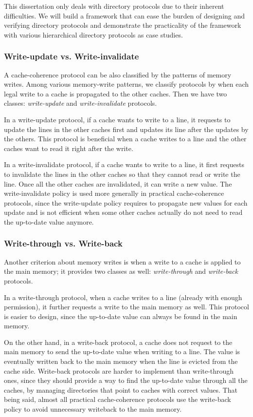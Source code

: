 This dissertation only deals with directory protocols due to their inherent difficulties.
We will build a framework that can ease the burden of designing and verifying directory protocols and demonstrate the practicality of the framework with various hierarchical directory protocols as case studies.

\subsubsection{Write-update vs. Write-invalidate}

A cache-coherence protocol can be also classified by the patterns of memory writes.
Among various memory-write patterns, we classify protocols by when each legal write to a cache is propagated to the other caches.
Then we have two classes: \emph{write-update} and \emph{write-invalidate} protocols.

In a write-update protocol, if a cache wants to write to a line, it requests to update the lines in the other caches first and updates its line after the updates by the others.
This protocol is beneficial when a cache writes to a line and the other caches want to read it right after the write.

In a write-invalidate protocol, if a cache wants to write to a line, it first requests to invalidate the lines in the other caches so that they cannot read or write the line.
Once all the other caches are invalidated, it can write a new value.
The write-invalidate policy is used more generally in practical cache-coherence protocols, since the write-update policy requires to propagate new values for each update and is not efficient when some other caches actually do not need to read the up-to-date value anymore.

\subsubsection{Write-through vs. Write-back}

Another criterion about memory writes is when a write to a cache is applied to the main memory; it provides two classes as well: \emph{write-through} and \emph{write-back} protocols.

In a write-through protocol, when a cache writes to a line (already with enough permission), it further requests a write to the main memory as well.
This protocol is easier to design, since the up-to-date value can always be found in the main memory.

On the other hand, in a write-back protocol, a cache does not request to the main memory to send the up-to-date value when writing to a line.
The value is eventually written back to the main memory when the line is evicted from the cache side.
Write-back protocols are harder to implement than write-through ones, since they should provide a way to find the up-to-date value through all the caches, \eg{} by managing directories that point to caches with correct values.
That being said, almost all practical cache-coherence protocols use the write-back policy to avoid unnecessary writeback to the main memory.

